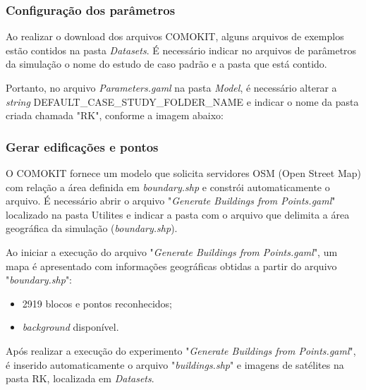 \subsubsection{Configuração dos parâmetros}

Ao realizar o download dos arquivos COMOKIT, alguns arquivos de exemplos estão contidos na pasta \textit{Datasets}. É necessário indicar no arquivos de parâmetros da simulação o nome do estudo de caso padrão e a pasta que está contido. 

Portanto, no arquivo \textit{Parameters.gaml} na pasta \textit{Model}, é necessário alterar a \textit{string} DEFAULT\_CASE\_STUDY\_FOLDER\_NAME e indicar o nome da pasta criada chamada "RK", conforme a imagem abaixo:



\subsubsection{Gerar edificações e pontos}

O COMOKIT fornece um modelo que solicita servidores OSM (Open Street Map) com 
 relação a área definida em \textit{boundary.shp} e constrói automaticamente o arquivo. 
É necessário abrir o arquivo "\textit{Generate Buildings from Points.gaml}"  localizado na pasta Utilites e indicar a pasta com o arquivo que delimita a área geográfica da simulação (\textit{boundary.shp}).


Ao iniciar a execução do arquivo "\textit{Generate Buildings from Points.gaml}", um mapa é apresentado com informações geográficas obtidas a partir do arquivo "\textit{boundary.shp}":

\begin{itemize}
\item 2919 blocos e pontos reconhecidos;
\item \textit{background} disponível.
\end{itemize}



Após realizar a execução do experimento "\textit{Generate Buildings from Points.gaml}", é inserido automaticamente o arquivo "\textit{buildings.shp}" e imagens de satélites na pasta RK, localizada em \textit{Datasets}.


